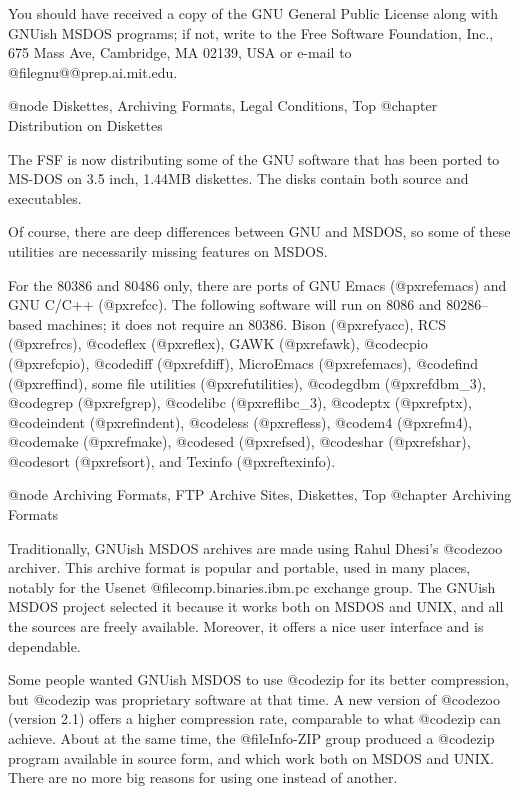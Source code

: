 You should have received a copy of the GNU General Public License
along with GNUish MSDOS programs; if not, write to the Free Software
Foundation, Inc., 675 Mass Ave, Cambridge, MA 02139, USA or e-mail to
@file{gnu@@prep.ai.mit.edu}.


@node Diskettes, Archiving Formats, Legal Conditions, Top
@chapter Distribution on Diskettes

The FSF is now distributing some of the GNU software that has been
ported to MS-DOS on 3.5 inch, 1.44MB diskettes.  The disks contain
both source and executables.

Of course, there are deep differences between GNU and MSDOS, so some of
these utilities are necessarily missing features on MSDOS.

For the 80386 and 80486 only, there are ports of GNU Emacs
(@pxref{emacs}) and GNU C/C++ (@pxref{cc}).  The following software will
run on 8086 and 80286--based machines; it does not require an 80386.
Bison (@pxref{yacc}), RCS (@pxref{rcs}), @code{flex} (@pxref{lex}), GAWK
(@pxref{awk}), @code{cpio} (@pxref{cpio}), @code{diff} (@pxref{diff}),
MicroEmacs (@pxref{emacs}), @code{find} (@pxref{find}), some file
utilities (@pxref{utilities}), @code{gdbm} (@pxref{dbm_3}), @code{grep}
(@pxref{grep}), @code{libc} (@pxref{libc_3}), @code{ptx} (@pxref{ptx}),
@code{indent} (@pxref{indent}), @code{less} (@pxref{less}), @code{m4}
(@pxref{m4}), @code{make} (@pxref{make}), @code{sed} (@pxref{sed}),
@code{shar} (@pxref{shar}), @code{sort} (@pxref{sort}), and Texinfo
(@pxref{texinfo}).

@node Archiving Formats, FTP Archive Sites, Diskettes, Top
@chapter Archiving Formats

Traditionally, GNUish MSDOS archives are made using Rahul Dhesi's
@code{zoo} archiver.  This archive format is popular and portable, used
in many places, notably for the Usenet @file{comp.binaries.ibm.pc}
exchange group.  The GNUish MSDOS project selected it because it works
both on MSDOS and UNIX, and all the sources are freely available.
Moreover, it offers a nice user interface and is dependable.

Some people wanted GNUish MSDOS to use @code{zip} for its better
compression, but @code{zip} was proprietary software at that time.  A
new version of @code{zoo} (version 2.1) offers a higher compression
rate, comparable to what @code{zip} can achieve.  About at the same
time, the @file{Info-ZIP} group produced a @code{zip} program available
in source form, and which work both on MSDOS and UNIX.  There are no
more big reasons for using one instead of another.

